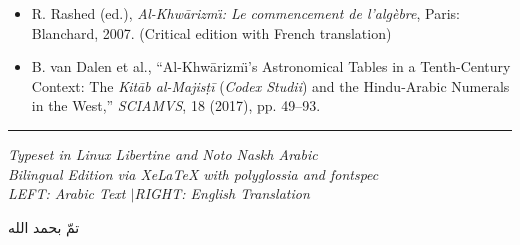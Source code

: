 \documentclass[10pt,a4paper]{book}
\newcommand{\ar}[1]{{\arabicfont\beginR #1\endR}}
\begin{document}
\begin{small}
\begin{itemize}[leftmargin=2em]
  \item R. Rashed (ed.), \textit{Al-Khw\=arizm\"{\i}: Le commencement de
  l'alg\`ebre}, Paris: Blanchard, 2007. (Critical edition with French
  translation)
  
  \item B. van Dalen et al., ``Al-Khw\=arizm\"{\i}'s Astronomical Tables in
  a Tenth-Century Context: The \textit{Kit\=ab al-Majis\d{t}\=i}
  (\textit{Codex Studii}) and the Hindu-Arabic Numerals in the West,''
  \textit{SCIAMVS}, 18 (2017), pp. 49--93.
\end{itemize}
\end{small}

\vfill

\begin{center}
\rule{0.3\textwidth}{0.4pt}

\vspace{0.3cm}

{\small\textit{Typeset in Linux Libertine and Noto Naskh Arabic}}\\[0.1cm]
{\small\textit{Bilingual Edition via XeLaTeX with polyglossia and fontspec}}\\[0.3cm]
{\small\textit{LEFT: Arabic Text \quad\textcolor{columnsepclr}{$|$}\quad RIGHT: English Translation}}

\vspace{0.5cm}

\begin{arabicbox}[boxrule=0pt,colback=white,width=0.6\textwidth]
\begin{center}
\ar{تمّ بحمد الله}
\end{center}
\end{arabicbox}
\end{center}
\end{document}
